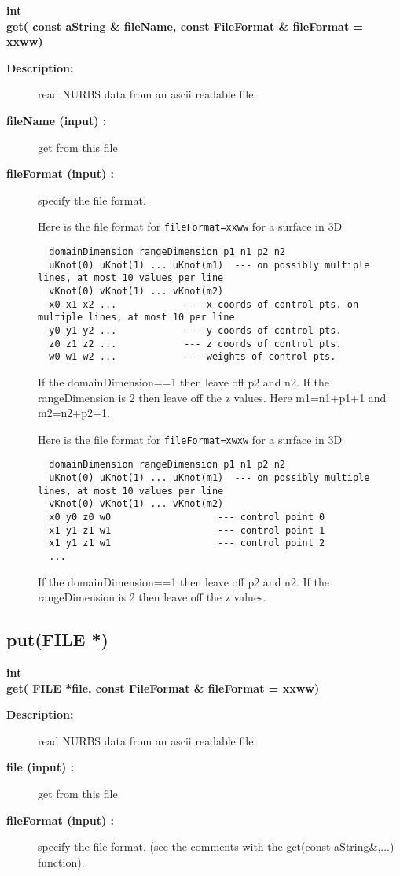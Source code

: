 \begin{flushleft} \textbf{%
int  \\ 
\settowidth{\NurbsMappingIncludeArgIndent}{get(}%
get( const aString \& fileName, const FileFormat \& fileFormat  = xxww)
}\end{flushleft}
\begin{description}
\item[{\bf Description:}] 
   read NURBS data from an ascii readable file.
\item[{\bf fileName (input) :}]  get from this file.
\item[{\bf fileFormat (input) :}]  specify the file format.

 \noindent Here is the file format for {\tt fileFormat=xxww} for a surface in 3D
 \begin{verbatim}
  domainDimension rangeDimension p1 n1 p2 n2  
  uKnot(0) uKnot(1) ... uKnot(m1)  --- on possibly multiple lines, at most 10 values per line
  vKnot(0) vKnot(1) ... vKnot(m2)
  x0 x1 x2 ...            --- x coords of control pts. on multiple lines, at most 10 per line
  y0 y1 y2 ...            --- y coords of control pts.                                  
  z0 z1 z2 ...            --- z coords of control pts.                                  
  w0 w1 w2 ...            --- weights of control pts.                                  
 \end{verbatim}
 If the domainDimension==1 then leave off p2 and n2. If the rangeDimension is 2 then leave 
  off the z values. Here m1=n1+p1+1 and m2=n2+p2+1.

 \noindent Here is the file format for {\tt fileFormat=xwxw} for a surface in 3D
 \begin{verbatim}
  domainDimension rangeDimension p1 n1 p2 n2
  uKnot(0) uKnot(1) ... uKnot(m1)  --- on possibly multiple lines, at most 10 values per line
  vKnot(0) vKnot(1) ... vKnot(m2)
  x0 y0 z0 w0                   --- control point 0
  x1 y1 z1 w1                   --- control point 1
  x1 y1 z1 w1                   --- control point 2
  ... 
 \end{verbatim}
 If the domainDimension==1 then leave off p2 and n2. If the rangeDimension is 2 then leave 
  off the z values.
\end{description}
\subsection{put(FILE *)}
 
\begin{flushleft} \textbf{%
int  \\ 
\settowidth{\NurbsMappingIncludeArgIndent}{get(}%
get( FILE *file, const FileFormat \& fileFormat  = xxww)
}\end{flushleft}
\begin{description}
\item[{\bf Description:}] 
   read NURBS data from an ascii readable file.
\item[{\bf file (input) :}]  get from this file.
\item[{\bf fileFormat (input) :}]  specify the file format. (see the comments with the get(const aString\&,...) function).
\end{description}
